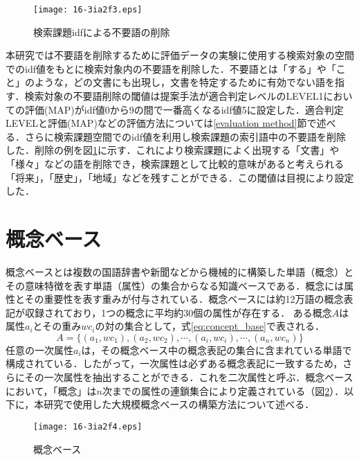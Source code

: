 \documentclass[japanese]{jnlp_1.4}
\begin{document}
\begin{figure}[t]
\begin{center}
\texttt{[image: 16-3ia2f3.eps]}
\caption{検索課題idfによる不要語の削除}
\label{fig:example_of_word}
\end{center}
\end{figure}

本研究では不要語を削除するために評価データの実験に使用する検索対象の空間でのidf値をもとに検索対象内の不要語を削除した．不要語とは「する」や「こと」のような，どの文書にも出現し，文書を特定するために有効でない語を指す．検索対象の不要語削除の閾値は提案手法が適合判定レベルのLEVEL1においての評価(MAP)がidf値0から9の間で一番高くなるidf値5に設定した．適合判定LEVELと評価(MAP)などの評価方法については\ref{evaluation method}節で述べる．さらに検索課題空間でのidf値を利用し検索課題の索引語中の不要語を削除した．削除の例を図\ref{fig:example_of_word}に示す．これにより検索課題によく出現する「文書」や「様々」などの語を削除でき，検索課題として比較的意味があると考えられる「将来」，「歴史」，「地域」などを残すことができる．この閾値は目視により設定した．


\section{概念ベース}
\label{concept base}

概念ベースとは複数の国語辞書や新聞などから機械的に構築した単語（概念）とその意味特徴を表す単語（属性）の集合からなる知識ベースである．概念には属性とその重要性を表す重みが付与されている．概念ベースには約12万語の概念表記が収録されており，1つの概念に平均約30個の属性が存在する．
ある概念$A$は属性$a_i$とその重み$wc_i$の対の集合として，式\ref{eq:concept_base}で表される．
\begin{equation}
 A=\{(a_1,wc_1),(a_2,wc_2),\cdots,(a_i,wc_i),\cdots,(a_n,wc_n)\}
 \label{eq:concept_base}
\end{equation}
任意の一次属性$a_i$は，その概念ベース中の概念表記の集合に含まれている単語で構成されている．したがって，一次属性は必ずある概念表記に一致するため，さらにその一次属性を抽出することができる．これを二次属性と呼ぶ．概念ベースにおいて，「概念」は$n$次までの属性の連鎖集合により定義されている（図\ref{fig:concept_base}）．以下に，本研究で使用した大規模概念ベースの構築方法について述べる．

\begin{figure}[b]
\begin{center}
\texttt{[image: 16-3ia2f4.eps]}
\caption{概念ベース}
\label{fig:concept_base}
\end{center}
\end{figure}
\end{document}

